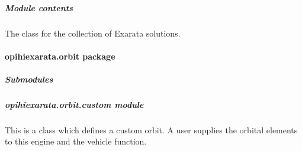 \documentclass[letterpaper,11pt,english]{sphinxmanual}
\begin{document}
\begin{savenotes}
\begin{fulllineitems}
\begin{savenotes}
\begin{fulllineitems}
\begin{quote}
\begin{description}
\begin{itemize}
\end{itemize}


\end{description}\end{quote}

\end{fulllineitems}\end{savenotes}


\end{fulllineitems}\end{savenotes}



\subparagraph{Module contents}
\label{\detokenize{code/opihiexarata.opihi:module-opihiexarata.opihi}}\label{\detokenize{code/opihiexarata.opihi:module-contents}}
\sphinxAtStartPar
The class for the collection of Exarata solutions.

\sphinxstepscope


\paragraph{opihiexarata.orbit package}
\label{\detokenize{code/opihiexarata.orbit:opihiexarata-orbit-package}}\label{\detokenize{code/opihiexarata.orbit::doc}}

\subparagraph{Submodules}
\label{\detokenize{code/opihiexarata.orbit:submodules}}
\sphinxstepscope


\subparagraph{opihiexarata.orbit.custom module}
\label{\detokenize{code/opihiexarata.orbit.custom:module-opihiexarata.orbit.custom}}\label{\detokenize{code/opihiexarata.orbit.custom:opihiexarata-orbit-custom-module}}\label{\detokenize{code/opihiexarata.orbit.custom::doc}}
\sphinxAtStartPar
This is a class which defines a custom orbit. A user supplies the orbital
elements to this engine and the vehicle function.
\end{document}
